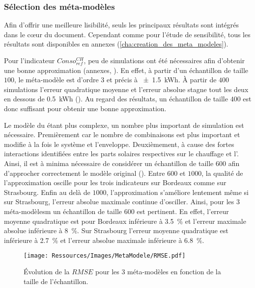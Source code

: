 \subsubsection{Sélection des méta-modèles} %
\label{ssub:selection_des_meta_modeles}
Afin d’offrir une meilleure lisibilité, seuls les principaux résultats sont intégrés dans
le cœur du document. Cependant comme pour l’étude de sensibilité, tous
les résultats sont disponibles en annexes (\ref{cha:creation_des_meta_modeles}).

Pour l’indicateur $Conso_{ref}^{CH}$, peu de simulations ont été nécessaires afin
d’obtenir une bonne approximation (annexes, ). En effet,
à partir d’un échantillon de taille $100$, le méta-modèle est d’ordre $3$ et précis à
\SI{+- 1.5}{kWh}. À partir de $400$ simulations l’erreur quadratique moyenne et l’erreur
absolue stagne tout les deux en dessous de \SI{0.5}{kWh} ().
Au regard des résultats, un échantillon de taille $400$ est donc suffisant pour obtenir
une bonne approximation.

Le modèle du  étant plus complexe, un nombre plus important de simulation est
nécessaire. Premièrement car le nombre de combinaisons est plus important et modifie à la
fois le système et l’enveloppe. Deuxièmement, à cause des fortes interactions identifiées
entre les parts solaires respectives sur le chauffage et l’. Ainsi, il est à
minima nécessaire de considérer un échantillon de taille $600$ afin d’approcher
correctement le modèle original ().
Entre $600$ et $1000$, la qualité de l’approximation oscille pour les trois indicateurs
sur Bordeaux comme sur Strasbourg. Enfin au delà de $1000$, l’approximation s’améliore
lentement même si sur Strasbourg, l’erreur absolue maximale continue d’osciller. Ainsi,
pour les $3$ méta-modèlesm un échantillon de taille $600$ est pertinent. En effet,
l’erreur moyenne quadratique est pour Bordeaux inférieure à
\SI{3.5}{\percent} et l’erreur maximale absolue inférieure à \SI{8}{\percent}. Sur
Strasbourg l’erreur moyenne quadratique est inférieure à
\SI{2.7}{\percent} et l’erreur absolue maximale inférieure à \SI{6.8}{\percent}.


\begin{figure}
    \centering
    \texttt{[image: Ressources/Images/MetaModele/RMSE.pdf]}
    \caption[Évolution de la $RMSE$ en fonction de l’échantillon]
            {Évolution de la $RMSE$ pour les \num{3} méta-modèles
             en fonction de la taille de l’échantillon.}
    \label{fig:rmse_mae}
\end{figure}

